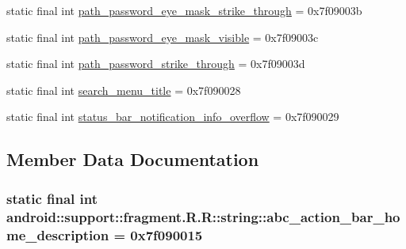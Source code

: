 \begin{CompactItemize}
\item 
static final int \hyperlink{classandroid_1_1support_1_1fragment_1_1_r_1_1string_217bddaea46b701cdcb0efab1fd0b59d}{path\_\-password\_\-eye\_\-mask\_\-strike\_\-through} = 0x7f09003b
\item 
static final int \hyperlink{classandroid_1_1support_1_1fragment_1_1_r_1_1string_e2a69c833c2ca9b32cc2f5c749e3b8f7}{path\_\-password\_\-eye\_\-mask\_\-visible} = 0x7f09003c
\item 
static final int \hyperlink{classandroid_1_1support_1_1fragment_1_1_r_1_1string_2ab1c68bf5feed83a6197ffe8b0332e3}{path\_\-password\_\-strike\_\-through} = 0x7f09003d
\item 
static final int \hyperlink{classandroid_1_1support_1_1fragment_1_1_r_1_1string_357987cd931ae56b9f21eb1075fc70c1}{search\_\-menu\_\-title} = 0x7f090028
\item 
static final int \hyperlink{classandroid_1_1support_1_1fragment_1_1_r_1_1string_3b8e37c8eabe3f249ba14764fbe70aaf}{status\_\-bar\_\-notification\_\-info\_\-overflow} = 0x7f090029
\end{CompactItemize}


\subsection{Member Data Documentation}
\hypertarget{classandroid_1_1support_1_1fragment_1_1_r_1_1string_50d54bb6cd3ba64c565846c9b0fc9546}{
\subsubsection[{abc\_\-action\_\-bar\_\-home\_\-description}]{\setlength{\rightskip}{0pt plus 5cm}static final int android::support::fragment.R.R::string::abc\_\-action\_\-bar\_\-home\_\-description = 0x7f090015}}
\label{classandroid_1_1support_1_1fragment_1_1_r_1_1string_50d54bb6cd3ba64c565846c9b0fc9546}


